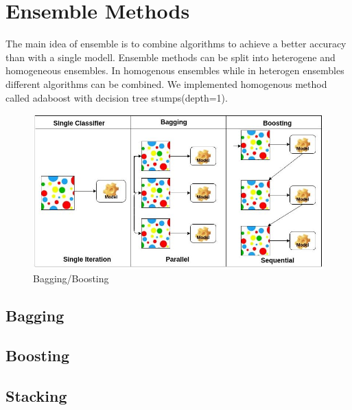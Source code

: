 \section{Ensemble Methods}
The main idea of ensemble is to combine algorithms to achieve a better accuracy than with a single modell. Ensemble methods can be split into heterogene and homogeneous ensembles. In homogenous ensembles while in heterogen ensembles different algorithms can be combined. 
We implemented homogenous method called adaboost with decision tree stumps(depth=1).    
\begin{figure}[hbtp]
	\centering
	\includegraphics[scale=0.5]{ensemble_1}
	\caption{Bagging/Boosting}
	\label{fig:Datensatz - unbearbeitet}
\end{figure}


\subsection{Bagging}



\subsection{Boosting}



\subsection{Stacking}


\newpage